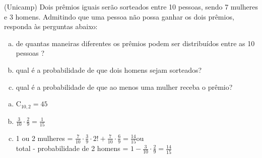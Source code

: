 \begin{ex}
 (Unicamp) Dois prêmios iguais serão sorteados entre 10 pessoas, sendo 7 mulheres e 3 homens. Admitindo que uma pessoa não possa ganhar os dois prêmios, responda às perguntas abaixo:
    \begin{enumerate}[(a)]
    \item de quantas maneiras diferentes os prêmios podem ser distribuídos entre as 10 pessoas ?
    \item qual é a probabilidade de que dois homens sejam sorteados?
    \item qual é a probabilidade de que ao menos uma mulher receba o prêmio?
    \end{enumerate}
     \begin{sol}
       \phantom{A}
       \begin{enumerate} [(a)]
           \item $\mathrm{C}_{{10},2}=45$
           \item $\frac{3}{10}\cdot\frac{2}{9}=\frac{1}{15}$
           \item 1 ou 2 mulheres = $\frac{7}{10}\cdot\frac{3}{9}\cdot2!+\frac{7}{10}\cdot\frac{6}{9}=\frac{14}{15}$\hspace{0.2cm}ou\\ total - probabilidade de 2 homens = $1-\frac{3}{10}\cdot\frac{2}{9}=\frac{14}{15}$
       \end{enumerate}
     \end{sol}
\end{ex}